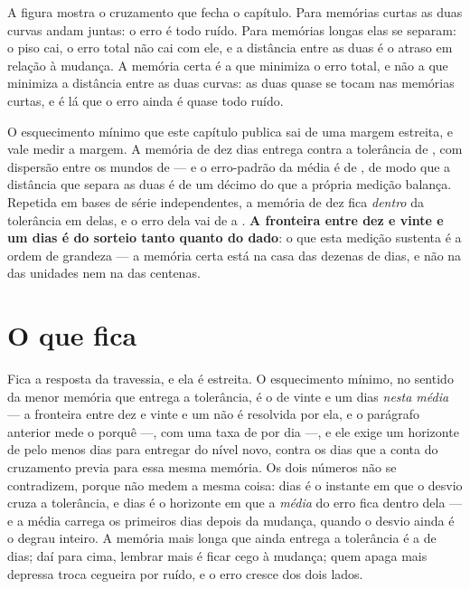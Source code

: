 A figura mostra o cruzamento que fecha o capítulo. Para memórias curtas as duas curvas andam juntas:
o erro é todo ruído. Para memórias longas elas se separam: o piso cai, o erro total não cai com ele,
e a distância entre as duas é o atraso em relação à mudança. A memória certa é a que minimiza o erro
total, e não a que minimiza a distância entre as duas curvas: as duas quase se tocam nas memórias
curtas, e é lá que o erro ainda é quase todo ruído.

O esquecimento mínimo que este capítulo publica sai de uma margem estreita, e vale medir a margem.
A memória de dez dias entrega \numEsquecimentoDezErro{} contra a tolerância de
\numEsquecimentoTolerancia{}, com dispersão entre os mundos de \numEsquecimentoDezDispersao{} --- e o
erro-padrão da média é de \numEsquecimentoDezErroPadrao{}, de modo que a distância que separa as duas
é de um décimo do que a própria medição balança. Repetida em \numEsquecimentoBases{} bases de série
independentes, a memória de dez fica \emph{dentro} da tolerância em \numEsquecimentoBasesDentro{}
delas, e o erro dela vai de \numEsquecimentoBaseDezMenor{} a \numEsquecimentoBaseDezMaior.
\textbf{A fronteira entre dez e vinte e um dias é do sorteio tanto quanto do dado}: o que esta medição
sustenta é a ordem de grandeza --- a memória certa está na casa das dezenas de dias, e não na das
unidades nem na das centenas.

\section{O que fica}

Fica a resposta da travessia, e ela é estreita. O esquecimento mínimo, no sentido da menor memória que
entrega a tolerância, é o de vinte e um dias \emph{nesta média} --- a fronteira entre dez e vinte e um
não é resolvida por ela, e o parágrafo anterior mede o porquê ---, com uma taxa de
\numEsquecimentoMelhorTaxa{} por
dia ---, e ele exige um horizonte de pelo menos \numEsquecimentoHorizonteCurto{} dias para entregar
\numEsquecimentoTolerancia{} do nível novo, contra os \numEsquecimentoMelhorDias{} dias que a conta
do cruzamento previa para essa mesma memória. Os dois números não se contradizem, porque não medem a
mesma coisa: \numEsquecimentoMelhorDias{} dias é o instante em que o desvio cruza a tolerância, e
\numEsquecimentoHorizonteCurto{} dias é o horizonte em que a \emph{média} do erro fica dentro dela ---
e a média carrega os primeiros dias depois da mudança, quando o desvio ainda é o degrau inteiro. A memória mais longa que ainda entrega a tolerância é a de \numEsquecimentoMemoriaLonga{} dias;
daí para cima, lembrar mais é ficar cego à mudança; quem apaga
mais depressa troca cegueira por ruído, e o erro cresce dos dois lados.

